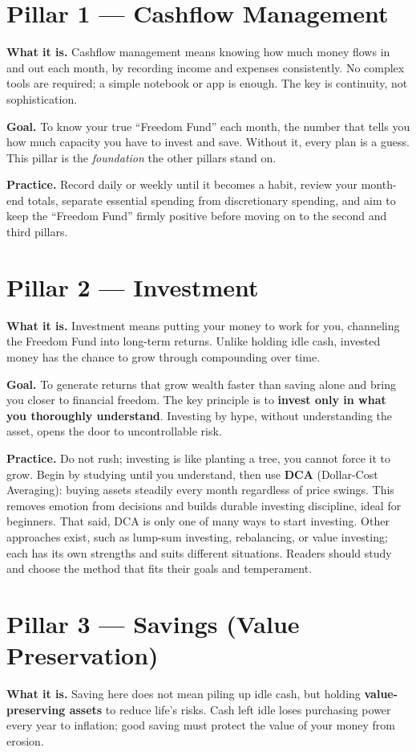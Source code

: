 \documentclass[10pt,a4paper,twocolumn]{article}
\begin{document}
\section{Pillar 1 --- Cashflow Management}
\textbf{What it is.} Cashflow management means knowing how much money flows in and out each month, by recording income and expenses consistently. No complex tools are required; a simple notebook or app is enough. The key is continuity, not sophistication.

\textbf{Goal.} To know your true ``Freedom Fund'' each month, the number that tells you how much capacity you have to invest and save. Without it, every plan is a guess. This pillar is the \textit{foundation} the other pillars stand on.

\textbf{Practice.} Record daily or weekly until it becomes a habit, review your month-end totals, separate essential spending from discretionary spending, and aim to keep the ``Freedom Fund'' firmly positive before moving on to the second and third pillars.

\section{Pillar 2 --- Investment}
\textbf{What it is.} Investment means putting your money to work for you, channeling the Freedom Fund into long-term returns. Unlike holding idle cash, invested money has the chance to grow through compounding over time.

\textbf{Goal.} To generate returns that grow wealth faster than saving alone and bring you closer to financial freedom. The key principle is to \textbf{invest only in what you thoroughly understand}. Investing by hype, without understanding the asset, opens the door to uncontrollable risk.

\textbf{Practice.} Do not rush; investing is like planting a tree, you cannot force it to grow. Begin by studying until you understand, then use \textbf{DCA} (Dollar-Cost Averaging): buying assets steadily every month regardless of price swings. This removes emotion from decisions and builds durable investing discipline, ideal for beginners. That said, DCA is only one of many ways to start investing. Other approaches exist, such as lump-sum investing, rebalancing, or value investing; each has its own strengths and suits different situations. Readers should study and choose the method that fits their goals and temperament.

\section{Pillar 3 --- Savings (Value Preservation)}
\textbf{What it is.} Saving here does not mean piling up idle cash, but holding \textbf{value-preserving assets} to reduce life's risks. Cash left idle loses purchasing power every year to inflation; good saving must protect the value of your money from erosion.
\end{document}
